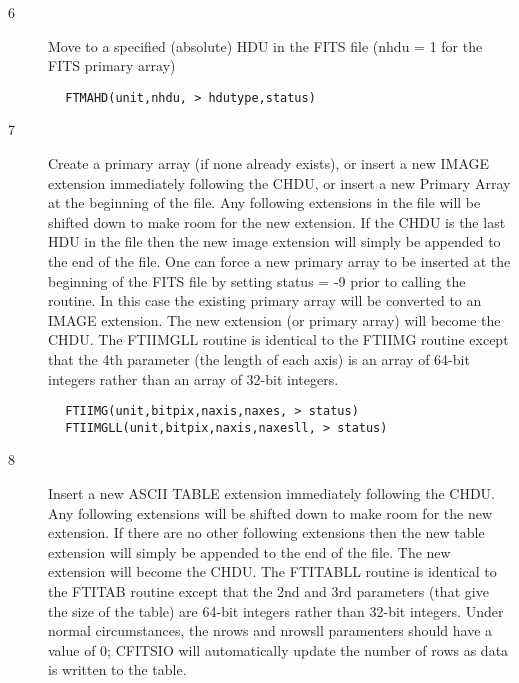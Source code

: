 \documentclass[11pt]{book}
\begin{document}
\begin{description}
\item[6 ] Move to a specified (absolute) HDU in the FITS file (nhdu = 1 for the
   FITS primary array)
\end{description}

\begin{verbatim}
        FTMAHD(unit,nhdu, > hdutype,status)
\end{verbatim}

\begin{description}
\item[7 ] Create a primary array (if none already exists), or insert a
    new IMAGE extension immediately following the CHDU, or
    insert a new Primary Array at the beginning of the file.  Any
    following extensions in the file will be shifted down to make room
    for the new extension.  If the CHDU is the last HDU in the file
    then the new image extension will simply be appended to the end of
    the file.   One can force a new primary array to be inserted at the
    beginning of the FITS file by setting status = -9 prior
    to calling the routine.  In this case the existing primary array will be
    converted to an IMAGE extension. The new extension (or primary
    array) will become the CHDU.  The FTIIMGLL routine is identical
    to the FTIIMG routine except that the 4th parameter (the length
    of each axis) is an array of 64-bit integers rather than an array
   of 32-bit integers.
\end{description}

\begin{verbatim}
        FTIIMG(unit,bitpix,naxis,naxes, > status)
        FTIIMGLL(unit,bitpix,naxis,naxesll, > status)
\end{verbatim}

\begin{description}
\item[8 ] Insert a new ASCII TABLE extension immediately following the CHDU.
    Any following extensions will be shifted down to make room for
    the new extension.  If there are no other following extensions
    then the new table extension will simply be appended to the
    end of the file.  The new extension will become the CHDU. The FTITABLL
    routine is identical
    to the FTITAB routine except that the 2nd and 3rd parameters (that give
    the size of the table) are 64-bit integers rather than
    32-bit integers.  Under normal circumstances, the nrows and nrowsll
    paramenters should have a value of 0; CFITSIO will automatically update
   the number of rows as data is written to the table.
\end{description}
\end{document}
